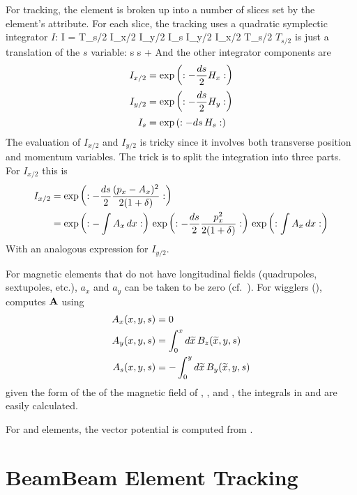 For tracking, the element is broken up into a number of slices set by
the element's  attribute. For each slice, the tracking
uses a quadratic symplectic integrator $I$:
\Begineq
  I = T_{s/2} \; I_{x/2} \; I_{y/2} \; I_s \; I_{y/2} \; I_{x/2} \; T_{s/2}
\Endeq
$T_{s/2}$ is just a translation of the $s$ variable:
\Begineq
  s \rightarrow s + 
\Endeq
And the other integrator components are
\begin{align}
  I_{x/2} &= \exp \left( : -\frac{ds}{2} H_x : \right) \nonumber \\
  I_{y/2} &= \exp \left( : -\frac{ds}{2} H_y : \right) \\
  I_{s}   &= \exp \left( : -ds \, H_s : \right) \nonumber
\end{align}
The evaluation of $I_{x/2}$ and $I_{y/2}$ is tricky since it involves both transverse
position and momentum variables. The trick is to split the integration into three parts.
For $I_{x/2}$ this is
\begin{align}
  I_{x/2} &= \exp \left( : -\frac{ds}{2} \frac{(p_x - A_x)^2}{2 (1 + \delta)} : \right) \nonumber \\
  &= \exp \left( : -\int A_x \, dx : \right) \,
     \exp \left( : -\frac{ds}{2} \frac{p_x^2}{2 (1 + \delta)} : \right) \,
     \exp \left( : \int A_x \, dx : \right)
  \label{ids2}
\end{align}
With an analogous expression for $I_{y/2}$.

For magnetic elements that do not have longitudinal fields
(quadrupoles, sextupoles, etc.), $a_x$ and $a_y$ can be taken to be
zero (cf.~). For wigglers (), \bmad computes ${\bf A}$ using
\begin{align}
  A_x(x,y,s) &= 0 \nonumber \\
  A_y(x,y,s) &=  \int_0^x d\widetilde x \, B_z(\widetilde x, y, s) 
  \label{a0a0a0} \\
  A_s(x,y,s) &= -\int_0^y d\widetilde x \, B_y(\widetilde x, y, s) \nonumber
\end{align}
given the form of the of the magnetic field of , , and
, the integrals in  and  are easily calculated.

For  and  elements, the vector potential is computed from
.

\section{BeamBeam Element Tracking}
\label{s:beambeam.std}

